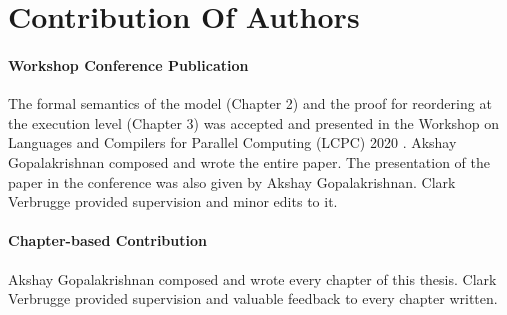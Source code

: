 




\section{Contribution Of Authors}

    \paragraph{Workshop Conference Publication}
        The formal semantics of the model (Chapter 2) and the proof for reordering at the execution level (Chapter 3) was accepted and presented in the Workshop on Languages and Compilers for Parallel Computing (LCPC) 2020 \cite{Akshay}. 
        Akshay Gopalakrishnan composed and wrote the entire paper.
        The presentation of the paper in the conference was also given by Akshay Gopalakrishnan.
        Clark Verbrugge provided supervision and minor edits to it.
        
    \paragraph{Chapter-based Contribution}

        Akshay Gopalakrishnan composed and wrote every chapter of this thesis.
        Clark Verbrugge provided supervision and valuable feedback to every chapter written.
        